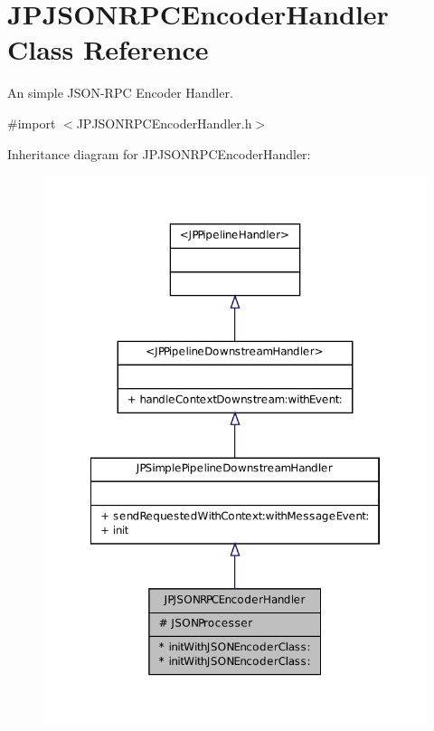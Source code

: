 \hypertarget{a00016}{
\section{JPJSONRPCEncoderHandler Class Reference}
\label{a00016}
}


An simple JSON-\/RPC Encoder Handler.  




{\ttfamily \#import $<$JPJSONRPCEncoderHandler.h$>$}



Inheritance diagram for JPJSONRPCEncoderHandler:\nopagebreak
\begin{figure}[H]
\begin{center}
\leavevmode
\includegraphics[width=322pt]{a00109}
\end{center}
\end{figure}


